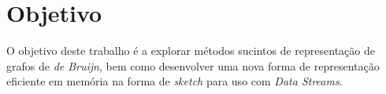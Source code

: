 \section{Objetivo}

O objetivo deste trabalho é a explorar métodos sucintos de representação
de grafos de \emph{de Bruijn}, bem como desenvolver uma nova forma de
representação eficiente em memória na forma de \emph{sketch} para uso com
\emph{Data Streams}.